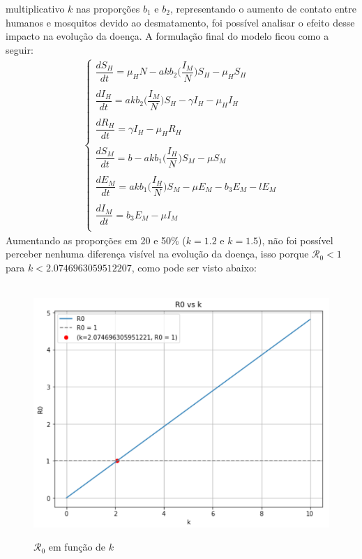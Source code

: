 multiplicativo $k$ nas proporções $b_1$ e $b_2$, representando o aumento de contato
entre humanos e mosquitos devido ao desmatamento, foi possível analisar o efeito desse impacto
na evolução da doença. A formulação final do modelo ficou como a seguir:
\begin{gather*}
\begin{cases}
\dfrac{dS_H}{dt} = \mu_HN-akb_2\bigg(\dfrac{I_M}{N}\bigg)S_H - \mu_HS_H\\
\\
\dfrac{dI_H}{dt} = akb_2\bigg(\dfrac{I_M}{N}\bigg)S_H-\gamma I_H - \mu_HI_H\\
\\
\dfrac{dR_H}{dt} = \gamma I_H - \mu_HR_H\\
\\
\dfrac{dS_M}{dt} = b - akb_1\bigg(\dfrac{I_H}{N}\bigg)S_M - \mu S_M\\
\\
\dfrac{dE_M}{dt} = akb_1\bigg(\dfrac{I_H}{N}\bigg)S_M - \mu E_M - b_3E_M -lE_M\\
\\
\dfrac{dI_M}{dt} = b_3E_M -\mu I_M\\
\end{cases}
\end{gather*}
Aumentando as proporções em 20 e 50\% ($k=1.2$ e $k=1.5$), não foi possível perceber
nenhuma diferença visível na evolução da doença, isso porque $\mathcal{R}_0 < 1$  
para $k < 2.0746963059512207$, como pode ser visto abaixo:
\begin{figure}[!ht]
        \centering
        \hbox{\hspace{3em} \includegraphics[scale=0.8] {Plot_R0_vs_k.png}}
        \caption{$\mathcal{R}_0$ em função de $k$}
\end{figure} 
